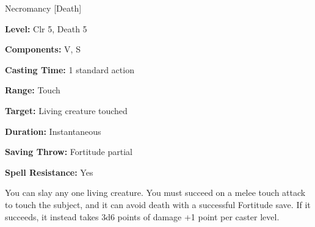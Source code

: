 
Necromancy [Death]

\textbf{Level:} Clr 5, Death 5

\textbf{Components:} V, S

\textbf{Casting Time:} 1 standard action

\textbf{Range:} Touch

\textbf{Target:} Living creature touched

\textbf{Duration:} Instantaneous

\textbf{Saving Throw:} Fortitude partial

\textbf{Spell Resistance:} Yes

You can slay any one living creature. You must succeed on a melee touch attack 
to touch the subject, and it can avoid death with a successful Fortitude save. 
If it succeeds, it instead takes 3d6 points of damage +1 point per caster level.

